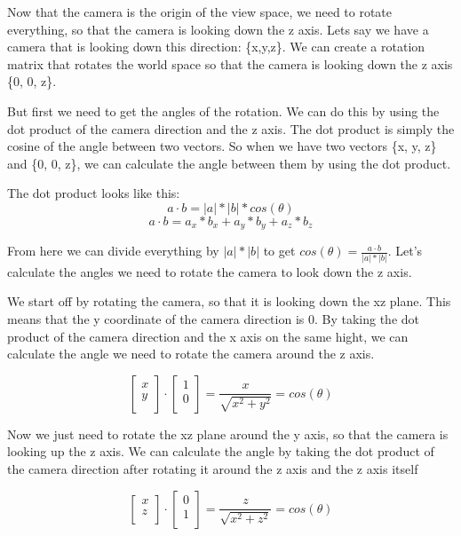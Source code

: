 \documentclass[12pt]{report} \usepackage{preamble}
\begin{document}
Now that the camera is the origin of the view space, we need to rotate everything,
so that the camera is looking down the z axis. Lets say we have a camera that
is looking down this direction: \{x,y,z\}. We can create a rotation matrix that
rotates the world space so that the camera is looking down the z axis \{0, 0, z\}.

But first we need to get the angles of the rotation. We can do this by using the
dot product of the camera direction and the z axis. The dot product is simply the
cosine of the angle between two vectors. So when we have two vectors \{x, y, z\}
and \{0, 0, z\}, we can calculate the angle between them by using the dot product.

The dot product looks like this:
\[a \cdot b = |a| * |b| * cos(\theta)\]
\[a \cdot b = a_x * b_x + a_y * b_y + a_z * b_z\]

From here we can divide everything by \(|a| * |b|\) to get \(cos(\theta)= \frac{a \cdot b}{|a| * |b|}\).
Let's calculate the angles we need to rotate the camera to look down the z axis.

We start off by rotating the camera, so that it is looking down the xz plane.
This means that the y coordinate of the camera direction is 0. By taking the dot
product of the camera direction and the x axis on the same hight, we can calculate the angle
we need to rotate the camera around the z axis.

\[
	\begin{bmatrix}
		x \\
		y \\
	\end{bmatrix}
	\cdot
	\begin{bmatrix}
		1 \\
		0 \\
	\end{bmatrix}
	=
	\frac{x}{\sqrt{x^2 + y^2}}
	=
	cos(\theta)
\]

Now we just need to rotate the xz plane around the y axis, so that the camera is looking
up the z axis. We can calculate the angle by taking the dot product of the camera direction
after rotating it around the z axis and the z axis itself

\[
	\begin{bmatrix}
		x \\
		z \\
	\end{bmatrix}
	\cdot
	\begin{bmatrix}
		0 \\
		1 \\
	\end{bmatrix}
	=
	\frac{z}{\sqrt{x^2 + z^2}}
	=
	cos(\theta)
\]
\end{document}
